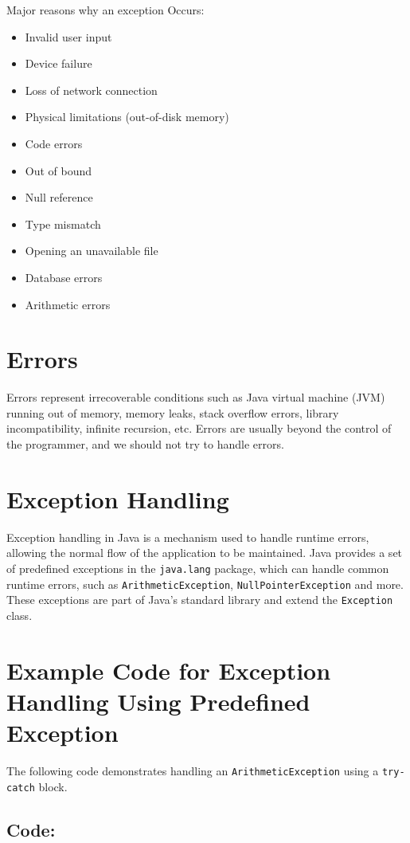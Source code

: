 \documentclass[a4paper,12pt]{article}
\begin{document}
Major reasons why an exception Occurs:
\begin{itemize}
    \item Invalid user input
    \item Device failure
    \item Loss of network connection
    \item Physical limitations (out-of-disk memory)
    \item Code errors
    \item Out of bound
    \item Null reference
    \item Type mismatch
    \item Opening an unavailable file
    \item Database errors
    \item Arithmetic errors
\end{itemize}

\section{Errors}
Errors represent irrecoverable conditions such as Java virtual machine (JVM) running out of memory, memory leaks, stack overflow errors, library incompatibility, infinite recursion, etc. Errors are usually beyond the control of the programmer, and we should not try to handle errors.

\section{Exception Handling}
Exception handling in Java is a mechanism used to handle runtime errors, allowing the normal flow of the application to be maintained. Java provides a set of predefined exceptions in the \texttt{java.lang} package, which can handle common runtime errors, such as \texttt{ArithmeticException}, \texttt{NullPointerException} and more. These exceptions are part of Java's standard library and extend the \texttt{Exception} class.


\section{Example Code for Exception Handling Using Predefined Exception}

The following code demonstrates handling an \texttt{ArithmeticException} using a \texttt{try-catch} block.

\subsection{Code:}
\end{document}
